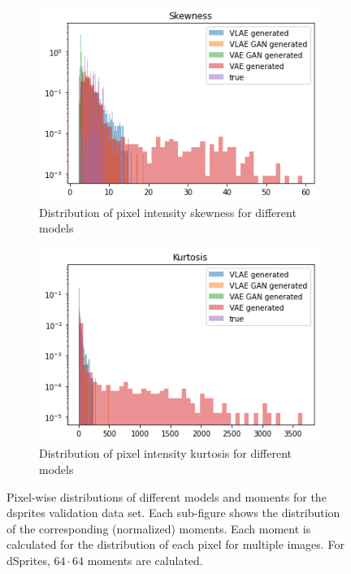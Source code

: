 \begin{figure}
    \hfill
    \begin{subfigure}{0.48\textwidth}
        \centering
        \includegraphics[width=\textwidth]{images/generated_vs_true/dsprites/dsprites_vs_models_skew.png}
        \caption{Distribution of pixel intensity skewness for different models}
        \label{subfig:skew_generated_vs_true_dsprites}
    \end{subfigure}
    \hfill
    \begin{subfigure}{0.48\textwidth}
        \centering
        \includegraphics[width=\textwidth]{images/generated_vs_true/dsprites/dsprites_vs_models_kurt.png}
        \caption{Distribution of pixel intensity kurtosis for different models}
        \label{subfig:kurt_generated_vs_true_dsprites}
    \end{subfigure}
    \caption[Models on dsprites: Pixel-wise distributions]{Pixel-wise distributions of different models and moments for the dsprites validation data set.
    Each sub-figure shows the distribution of the corresponding (normalized) moments. Each moment is calculated for the distribution of each pixel for multiple images.
    For dSprites, $64\cdot 64$ moments are calulated.}
    \label{fig:mean_generated_vs_true_dsprites}
\end{figure}

